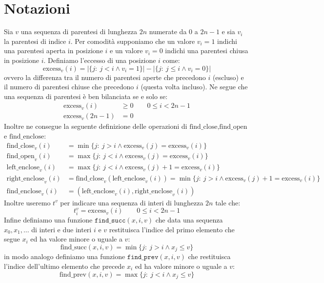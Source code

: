 \documentclass{article}
\begin{document}
\section{Notazioni}
Sia $v$ una sequenza di parentesi di lunghezza $2n$ numerate da $0$ a $2n-1$ e sia $v_i$ la parentesi di indice $i$. Per comodità supponiamo che un valore $v_i=1$ indichi una parentesi aperta in posizione $i$ e un valore $v_i=0$ indichi una parentesi chiusa in posizione $i$. Definiamo l'eccesso di una posizione $i$ come:
    $$
    \text{excess}_v(i) = |\{j :\ j<i \land v_i=1\}|-|\{j :\ j\leq i \land v_i=0\}|
    $$
ovvero la differenza tra il numero di parentesi aperte che precedono $i$ (escluso) e il numero di parentesi chiuse che precedono $i$ (questa volta incluso).
Ne segue che una sequenza di parentesi è ben bilanciata se e solo se:
    \begin{align*}
    \text{excess}_v(i) &\geq 0 \qquad 0\leq i < 2n-1 \\
    \text{excess}_v(2n-1) &= 0
    \end{align*}
Inoltre ne consegue la seguente definizione delle operazioni di $\text{find\_close},\text{find\_open}$ e $\text{find\_enclose}$:
    \begin{align*}
    \text{find\_close}_v(i) &= \min\{j :\ j>i \land \text{excess}_v(j)=\text{excess}_v(i)\} \\
    \text{find\_open}_v(i) &= \max\{j :\ j<i \land \text{excess}_v(j)=\text{excess}_v(i)\} \\
    \text{left\_enclose}_v(i) &= \max\{j :\ j<i \land \text{excess}_v(j)+1=\text{excess}_v(i)\} \\
    \text{right\_enclose}_v(i) &= \text{find\_close}_v(\text{left\_enclose}_v(i)) = \min\{j :\ j>i \land \text{excess}_v(j)+1=\text{excess}_v(i)\} \\
    \text{find\_enclose}_v(i) &= (\text{left\_enclose}_v(i),\text{right\_enclose}_v(i))
    \end{align*}
Inoltre useremo $t^v$ per indicare una sequenza di interi di lunghezza $2n$ tale che:
    $$
    t^v_i=\text{excess}_v(i) \qquad 0\leq i < 2n-1
    $$
Infine definiamo una funzione $\texttt{find\_succ}(x,i,v)$ che data una sequenza $x_0,x_1,\dots$ di interi e due interi $i$ e $v$ restituisca l'indice del primo elemento che segue $x_i$ ed ha valore minore o uguale a $v$:
    $$
    \text{find\_succ}(x,i,v)=\min\{j :\ j>i \land x_j\leq v\}
    $$
in modo analogo definiamo una funzione $\texttt{find\_prev}(x,i,v)$ che restituisca l'indice dell'ultimo elemento che precede $x_i$ ed ha valore minore o uguale a $v$:
    $$
    \text{find\_prev}(x,i,v)=\max\{j :\ j<i \land x_j\leq v\}
    $$
\end{document}
